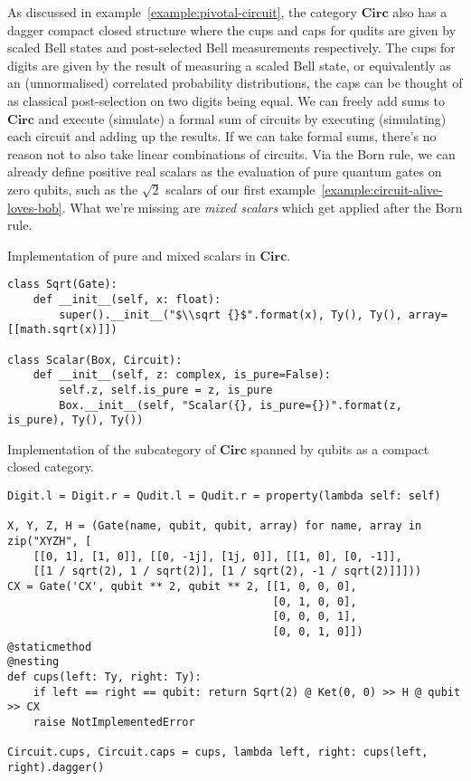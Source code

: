 As discussed in example~\ref{example:pivotal-circuit}, the category $\mathbf{Circ}$ also has a dagger compact closed structure where the cups and caps for qudits are given by scaled Bell states and post-selected Bell measurements respectively.
The cups for digits are given by the result of measuring a scaled Bell state, or equivalently as an (unnormalised) correlated probability distributions, the caps can be thought of as classical post-selection on two digits being equal.
We can freely add sums to $\mathbf{Circ}$ and execute (simulate) a formal sum of circuits by executing (simulating) each circuit and adding up the results.
If we can take formal sums, there's no reason not to also take linear combinations of circuits.
Via the Born rule, we can already define positive real scalars as the evaluation of pure quantum gates on zero qubits, such as the $\sqrt 2$ scalars of our first example~\ref{example:circuit-alive-loves-bob}.
What we're missing are \emph{mixed scalars} which get applied after the Born rule.

\begin{python}\label{listing:mixed-scalars}
{\normalfont Implementation of pure and mixed scalars in $\mathbf{Circ}$.}

\begin{verbatim}
class Sqrt(Gate):
    def __init__(self, x: float):
        super().__init__("$\\sqrt {}$".format(x), Ty(), Ty(), array=[[math.sqrt(x)]])

class Scalar(Box, Circuit):
    def __init__(self, z: complex, is_pure=False):
        self.z, self.is_pure = z, is_pure
        Box.__init__(self, "Scalar({}, is_pure={})".format(z, is_pure), Ty(), Ty())
\end{verbatim}
\end{python}

\begin{python}
{\normalfont Implementation of the subcategory of $\mathbf{Circ}$ spanned by qubits as a compact closed category.}

\begin{verbatim}
Digit.l = Digit.r = Qudit.l = Qudit.r = property(lambda self: self)

X, Y, Z, H = (Gate(name, qubit, qubit, array) for name, array in zip("XYZH", [
    [[0, 1], [1, 0]], [[0, -1j], [1j, 0]], [[1, 0], [0, -1]],
    [[1 / sqrt(2), 1 / sqrt(2)], [1 / sqrt(2), -1 / sqrt(2)]]]))
CX = Gate('CX', qubit ** 2, qubit ** 2, [[1, 0, 0, 0],
                                         [0, 1, 0, 0],
                                         [0, 0, 0, 1],
                                         [0, 0, 1, 0]])
@staticmethod
@nesting
def cups(left: Ty, right: Ty):
    if left == right == qubit: return Sqrt(2) @ Ket(0, 0) >> H @ qubit >> CX
    raise NotImplementedError

Circuit.cups, Circuit.caps = cups, lambda left, right: cups(left, right).dagger()
\end{verbatim}
\end{python}

